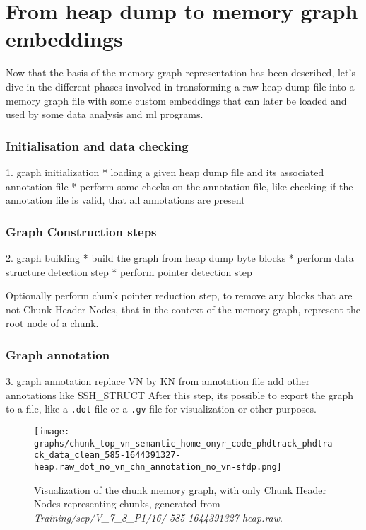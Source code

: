 \section{From heap dump to memory graph embeddings}
Now that the basis of the memory graph representation has been described, let's dive in the different phases involved in transforming a raw heap dump file into a memory graph file with some custom embeddings that can later be loaded and used by some data analysis and \acrshort{ml} programs.

\subsubsection{Initialisation and data checking}
1. graph initialization
* loading a given heap dump file and its associated annotation file
* perform some checks on the annotation file, like checking if the annotation file is valid, that all annotations are present

\subsubsection{Graph Construction steps}
2. graph building
* build the graph from heap dump byte blocks
* perform data structure detection step
* perform pointer detection step

Optionally perform chunk pointer reduction step, to remove any blocks that are not Chunk Header Nodes, that in the context of the memory graph, represent the root node of a chunk. 

\subsubsection{Graph annotation}

3. graph annotation
replace VN by KN from annotation file
add other annotations like SSH\_STRUCT
After this step, its possible to export the graph to a file, like a \texttt{.dot} file or a \texttt{.gv} file for visualization or other purposes.

\begin{figure}[H]\label{methods:mem_graph:585-1644391327:chunk_only}
    \centering
    \texttt{[image: graphs/chunk\_top\_vn\_semantic\_home\_onyr\_code\_phdtrack\_phdtrack\_data\_clean\_585-1644391327-heap.raw\_dot\_no\_vn\_chn\_annotation\_no\_vn-sfdp.png]}
    \caption{Visualization of the chunk memory graph, with only Chunk Header Nodes representing chunks, generated from \textit{Training/scp/V\_7\_8\_P1/16/
    585-1644391327-heap.raw}.}
\end{figure}

